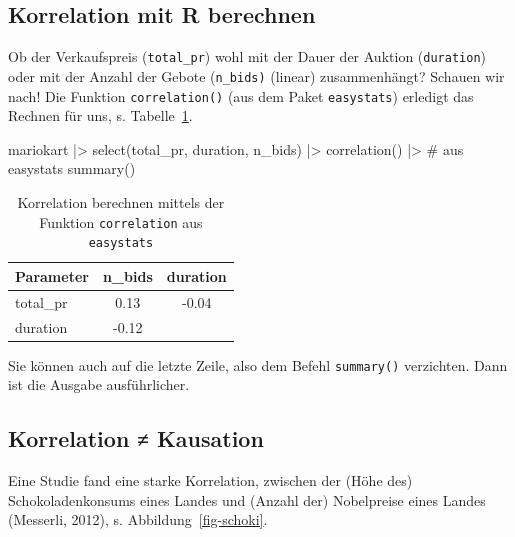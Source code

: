 \documentclass[
  letterpaper,
]{scrbook}
\newenvironment{Shaded}{\begin{snugshade}}{\end{snugshade}}
\newcommand{\CommentTok}[1]{\textcolor[rgb]{0.37,0.37,0.37}{#1}}
\newcommand{\FunctionTok}[1]{\textcolor[rgb]{0.28,0.35,0.67}{#1}}
\newcommand{\NormalTok}[1]{\textcolor[rgb]{0.00,0.23,0.31}{#1}}
\newcommand{\SpecialCharTok}[1]{\textcolor[rgb]{0.37,0.37,0.37}{#1}}
\theoremstyle{definition}
\theoremstyle{definition}
\theoremstyle{definition}
\theoremstyle{remark}
\begin{document}
\subsection{Korrelation mit R
berechnen}\label{korrelation-mit-r-berechnen}

Ob der Verkaufspreis (\texttt{total\_pr}) wohl mit der Dauer der Auktion
(\texttt{duration}) oder mit der Anzahl der Gebote (\texttt{n\_bids)}
(linear) zusammenhängt? Schauen wir nach! Die Funktion
\texttt{correlation()} (aus dem Paket \texttt{easystats}) erledigt das
Rechnen für uns, s. Tabelle~\ref{tbl-mario-corr1}.

\begin{Shaded}
\begin{Highlighting}[]
\NormalTok{mariokart }\SpecialCharTok{|\textgreater{}} 
  \FunctionTok{select}\NormalTok{(total\_pr, duration, n\_bids) }\SpecialCharTok{|\textgreater{}} 
  \FunctionTok{correlation}\NormalTok{()  }\SpecialCharTok{|\textgreater{}}  \CommentTok{\# aus \textasciigrave{}easystats\textasciigrave{}}
  \FunctionTok{summary}\NormalTok{()}
\end{Highlighting}
\end{Shaded}

\begin{longtable}[]{@{}lcc@{}}

\caption{\label{tbl-mario-corr1}Korrelation berechnen mittels der
Funktion \texttt{correlation} aus \texttt{easystats}}

\tabularnewline

\toprule\noalign{}
Parameter & n\_bids & duration \\
\midrule\noalign{}
\endhead
\bottomrule\noalign{}
\endlastfoot
total\_pr & 0.13 & -0.04 \\
duration & -0.12 & \\

\end{longtable}

Sie können auch auf die letzte Zeile, also dem Befehl \texttt{summary()}
verzichten. Dann ist die Ausgabe ausführlicher.

\subsection{Korrelation ≠ Kausation}\label{korrelation-kausation}

Eine Studie fand eine starke Korrelation, zwischen der (Höhe des)
Schokoladenkonsums eines Landes und (Anzahl der) Nobelpreise eines
Landes (Messerli, 2012), s. Abbildung~\ref{fig-schoki}.
\end{document}

